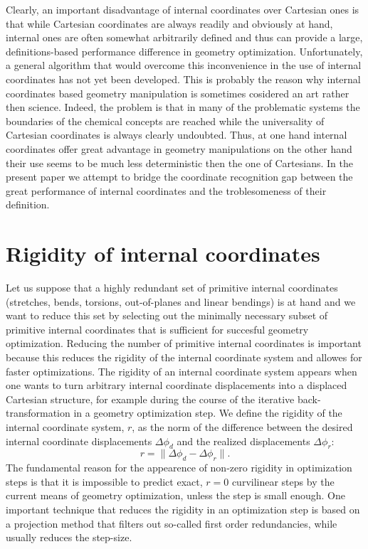 \documentclass[prl,aps,preprint,superbib,12pt]{revtex4}
\begin{document}
Clearly, an important disadvantage of internal coordinates 
over Cartesian ones
is that while Cartesian coordinates are always readily and
obviously at hand,
internal ones are often somewhat arbitrarily defined and thus
can provide a large, definitions-based performance difference
in geometry optimization. 
Unfortunately,
a general algorithm that would overcome this inconvenience in the use
of internal coordinates has not yet been developed. This is probably
the reason why internal coordinates based geometry manipulation
is sometimes cosidered an art rather then science.
Indeed, the problem is that in many of the
problematic systems the boundaries of the chemical concepts are 
reached while the universality of Cartesian coordinates is always 
clearly undoubted. Thus, at one hand internal coordinates offer
great advantage in geometry manipulations on the other hand their
use seems to be much less deterministic then the one of Cartesians.
In the present paper we attempt to bridge the coordinate recognition
gap between the great performance of internal coordinates and the 
troblesomeness of their definition.

\section{Rigidity of internal coordinates}
Let us suppose that a highly redundant set of primitive
internal coordinates (stretches, bends, torsions, out-of-planes
and linear bendings) is
at hand and we want to reduce this set 
by selecting out the minimally necessary subset of 
primitive internal coordinates that is sufficient for succesful
geometry optimization.
Reducing the number of primitive internal coordinates
is important because this reduces the rigidity of the internal 
coordinate system and allowes for faster optimizations.
The rigidity of an internal coordinate system appears when
one wants to turn arbitrary internal coordinate displacements
into a displaced Cartesian structure, for example
during the course of the iterative back-transformation 
\cite{PPulay77} in a geometry optimization step. 
We define the rigidity of the internal coordinate system, $r$, 
as the norm of the difference between the desired internal coordinate 
displacements $\Delta \phi_{d}$ 
and the realized displacements $\Delta \phi_{r}$: 
\begin{equation}
r = \| \Delta \phi_{d} - \Delta \phi_{r} \| .
\end{equation}
The fundamental reason for the appearence of non-zero
rigidity in optimization steps is 
that it is impossible to predict exact, $r=0$ curvilinear
steps by the current means of geometry optimization, unless
the step is small enough. 
One important technique 
that reduces the rigidity in an optimization step
is based on a projection method \cite{PPulay92} that filters out
so-called first order redundancies, while usually reduces 
the step-size.
\end{document}
